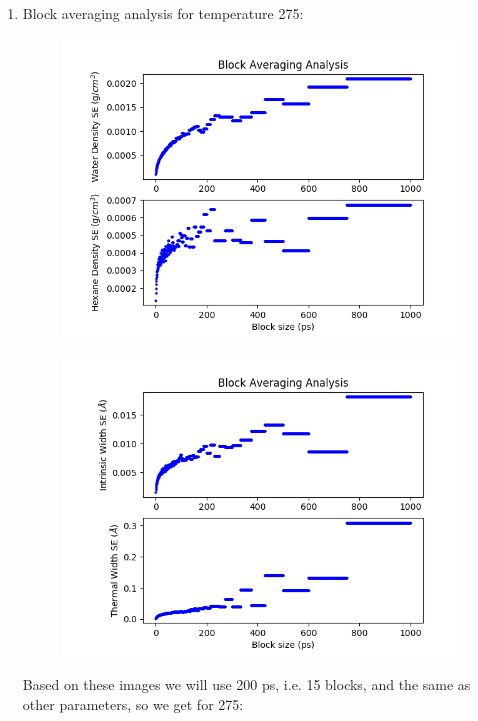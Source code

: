 \documentclass[12pt,reqno]{amsart}
\numberwithin{equation}{section}
\begin{document}
\begin{enumerate}
\item Block averaging analysis for temperature 275:

\begin{figure}[H]
\centering
\includegraphics[scale=0.6]{density_profile_block_averaging_1_full-275-1bead}
\end{figure}

\begin{figure}[H]
\centering
\includegraphics[scale=0.6]{density_profile_block_averaging_2_full-275-1bead}
\end{figure}

Based on these images we will use 200 ps, i.e. 15 blocks, and the same as other parameters, so we get for 275:


\end{enumerate}
\end{document}
